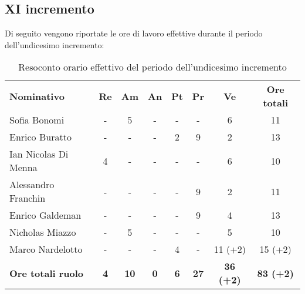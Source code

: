 \documentclass[../piano-di-progetto.tex]{subfiles}
\begin{document}
\subsection{XI incremento}

Di seguito vengono riportate le ore di lavoro effettive durante il periodo dell'undicesimo incremento:
\begin{table}[H]
    \centering
    \begin{tabular}{lccccccc}
      \rowcolor{lightgray}
      \textbf{Nominativo}       & \textbf{Re}      & \textbf{Am} & \textbf{An}      & \textbf{Pt} & \textbf{Pr} & \textbf{Ve} & \textbf{Ore totali} \\
Sofia Bonomi              & -          & 5           & -          & -          & -           & 6                & 11               \\
Enrico Buratto            & -          & -           & -          & 2          & 9           & 2                & 13               \\
Ian Nicolas Di Menna      & 4          & -           & -          & -          & -           & 6                & 10               \\
Alessandro Franchin       & -          & -           & -          & -          & 9           & 2                & 11               \\
Enrico Galdeman           & -          & -           & -          & -          & 9           & 4                & 13               \\
Nicholas Miazzo           & -          & 5           & -          & -          & -           & 5                & 10               \\
Marco Nardelotto          & -          & -           & -          & 4          & -           & 11 (+2)          & 15 (+2)          \\
\textbf{Ore totali ruolo} & \textbf{4} & \textbf{10} & \textbf{0} & \textbf{6} & \textbf{27} & \textbf{36 (+2)} & \textbf{83 (+2)}

    \end{tabular}
    \caption{Resoconto orario effettivo del periodo dell'undicesimo incremento}
  \end{table}
\end{document}
